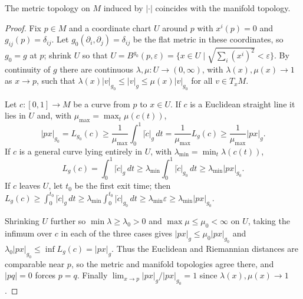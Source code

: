 \begin{theorem}
  \label{thm:pet-ch5-metric-topology}
  \leanok
  The metric topology on $M$ induced by $|\cdot|$ coincides with the manifold
  topology.
\end{theorem}
\begin{proof}
  \leanok
  Fix $p\in M$ and a coordinate chart $U$ around $p$ with $x^i(p)=0$ and
  $g_{ij}(p)=\delta_{ij}$. Let $g_0(\partial_i,\partial_j)=\delta_{ij}$ be the flat metric
  in these coordinates, so $g_0=g$ at $p$; shrink $U$ so that
  $U=B^{g_0}(p,\varepsilon)=\{x\in U\mid\sqrt{\textstyle\sum_i(x^i)^2}<\varepsilon\}$.
  By continuity of $g$ there are continuous $\lambda,\mu:U\to(0,\infty)$, with
  $\lambda(x),\mu(x)\to1$ as $x\to p$, such that
  $\lambda(x)|v|_{g_0}\le|v|_g\le\mu(x)|v|_{g_0}$ for all $v\in T_xM$.

  Let $c:[0,1]\to M$ be a curve from $p$ to $x\in U$. If $c$ is a Euclidean straight
  line it lies in $U$ and, with $\mu_{\max}=\max_t\mu(c(t))$,
  \[
    |px|_{g_0}=L_{g_0}(c)\ge\frac1{\mu_{\max}}\int_0^1|\dot c|_g\,dt
    =\frac1{\mu_{\max}}L_g(c)\ge\frac1{\mu_{\max}}|px|_g.
  \]
  If $c$ is a general curve lying entirely in $U$, with $\lambda_{\min}=\min_t
  \lambda(c(t))$,
  \[
    L_g(c)=\int_0^1|\dot c|_g\,dt\ge\lambda_{\min}\int_0^1|\dot c|_{g_0}\,dt
    \ge\lambda_{\min}|px|_{g_0}.
  \]
  If $c$ leaves $U$, let $t_0$ be the first exit time; then
  $L_g(c)\ge\int_0^{t_0}|\dot c|_g\,dt\ge\lambda_{\min}\int_0^{t_0}|\dot c|_{g_0}\,dt
  \ge\lambda_{\min}\varepsilon\ge\lambda_{\min}|px|_{g_0}$.

  Shrinking $U$ further so $\min\lambda\ge\lambda_0>0$ and $\max\mu\le\mu_0<\infty$
  on $U$, taking the infimum over $c$ in each of the three cases gives
  $|px|_g\le\mu_0|px|_{g_0}$ and $\lambda_0|px|_{g_0}\le\inf L_g(c)=|px|_g$. Thus the
  Euclidean and Riemannian distances are comparable near $p$, so the metric and
  manifold topologies agree there, and $|pq|=0$ forces $p=q$. Finally
  $\lim_{x\to p}|px|_g/|px|_{g_0}=1$ since $\lambda(x),\mu(x)\to1$.
\end{proof}

